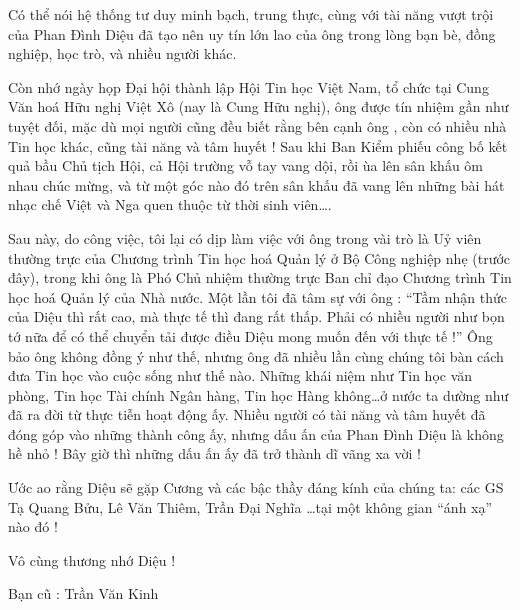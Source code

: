 Có thể nói hệ thống tư duy minh bạch, trung thực,  cùng với tài năng vượt trội của Phan Đình Diệu đã tạo nên uy tín lớn lao của ông trong lòng  bạn bè, đồng nghiệp, học trò, và nhiều người khác.

Còn nhớ ngày họp Đại hội thành lập Hội Tin học Việt Nam, tổ chức tại Cung Văn hoá Hữu nghị Việt Xô (nay là Cung Hữu nghị), ông được tín nhiệm gần như tuyệt đối, mặc dù mọi người cũng đều biết rằng bên cạnh ông , còn có nhiều nhà Tin học khác, cũng tài năng và tâm huyết !  Sau khi Ban Kiểm phiếu công bố kết quả bầu Chủ tịch Hội, cả Hội trường vỗ tay vang dội, rồi ùa lên sân khấu ôm nhau chúc mừng, và từ một góc nào đó trên sân khấu đã vang lên những bài hát nhạc chế Việt và Nga quen thuộc từ thời sinh viên….

Sau này, do công việc, tôi lại có dịp làm việc với ông trong vài trò là Uỷ viên thường trực của Chương trình Tin học hoá Quản lý ở Bộ Công nghiệp nhẹ (trước đây), trong khi ông là Phó Chủ nhiệm thường trực Ban chỉ đạo Chương trình Tin học hoá Quản lý của Nhà nước. Một lần tôi đã tâm sự với ông : “Tầm nhận thức của Diệu thì rất cao, mà thực tế thì đang rất thấp. Phải có nhiều người như bọn tớ nữa để có thể chuyển tải được điều Diệu mong muốn đến với thực tế !” Ông bảo ông không đồng ý như thế, nhưng ông đã nhiều lần cùng chúng tôi bàn cách đưa Tin học vào cuộc sống như thế nào. Những khái niệm như Tin học văn phòng, Tin học Tài chính Ngân hàng, Tin học Hàng không…ở nước ta dường như đã ra đời từ thực tiễn hoạt động ấy. Nhiều người có tài năng và tâm huyết đã đóng góp vào những thành công ấy, nhưng dấu ấn của Phan Đình Diệu là không hề nhỏ !
Bây giờ thì những dấu ấn ấy đã trở thành dĩ vãng xa vời ! 

Ước ao rằng Diệu sẽ gặp Cương và các bậc thầy đáng kính của chúng ta: các GS Tạ Quang Bửu, Lê Văn Thiêm, Trần Đại Nghĩa …tại một không gian “ánh xạ” nào đó !

Vô cùng thương nhớ Diệu !

Bạn cũ : Trần Văn Kinh